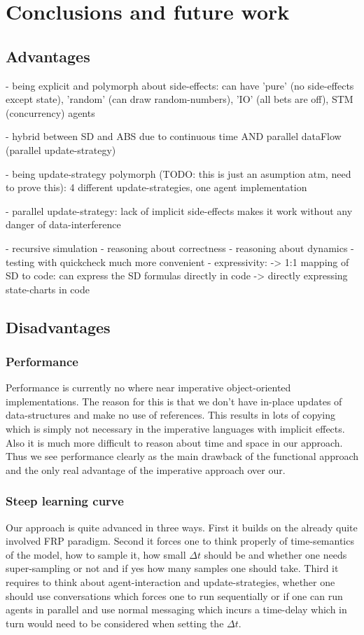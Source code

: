 \section{Conclusions and future work}

\subsection{Advantages}
- being explicit and polymorph about side-effects: can have 'pure' (no side-effects except state), 'random' (can draw random-numbers), 'IO' (all bets are off), STM (concurrency) agents

- hybrid between SD and ABS due to continuous time AND parallel dataFlow (parallel update-strategy)

- being update-strategy polymorph (TODO: this is just an asumption atm, need to prove this): 4 different update-strategies, one agent implementation

- parallel update-strategy: lack of implicit side-effects makes it work without any danger of data-interference

- recursive simulation
- reasoning about correctness
- reasoning about dynamics 
- testing with quickcheck much more convenient
- expressivity:
	-> 1:1 mapping of SD to code: can express the SD formulas directly in code
	-> directly expressing state-charts in code
	
\subsection{Disadvantages}

\subsubsection{Performance}
Performance is currently no where near imperative object-oriented implementations. The reason for this is that we don't have in-place updates of data-structures and make no use of references. This results in lots of copying which is simply not necessary in the imperative languages with implicit effects. Also it is much more difficult to reason about time and space in our approach. Thus we see performance clearly as the main drawback of the functional approach and the only real advantage of the imperative approach over our.

\subsubsection{Steep learning curve}
Our approach is quite advanced in three ways. First it builds on the already quite involved FRP paradigm. Second it forces one to think properly of time-semantics of the model, how to sample it, how small $\Delta t$ should be and whether one needs super-sampling or not and if yes how many samples one should take. Third it requires to think about agent-interaction and update-strategies, whether one should use conversations which forces one to run sequentially or if one can run agents in parallel and use normal messaging which incurs a time-delay which in turn would need to be considered when setting the $\Delta t$.

